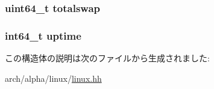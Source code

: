 \label{structAlphaLinux_1_1tgt__sysinfo_a4e4ed68dad22afd974a82cbc557525dc}
\hypertarget{structAlphaLinux_1_1tgt__sysinfo_a083d391d3cd3c507c32c0b3967fdb33c}{
\subsubsection[{totalswap}]{\setlength{\rightskip}{0pt plus 5cm}uint64\_\-t {\bf totalswap}}}
\label{structAlphaLinux_1_1tgt__sysinfo_a083d391d3cd3c507c32c0b3967fdb33c}
\hypertarget{structAlphaLinux_1_1tgt__sysinfo_a382d83f87fed25a254be85c2a0b40b03}{
\subsubsection[{uptime}]{\setlength{\rightskip}{0pt plus 5cm}int64\_\-t {\bf uptime}}}
\label{structAlphaLinux_1_1tgt__sysinfo_a382d83f87fed25a254be85c2a0b40b03}


この構造体の説明は次のファイルから生成されました:\begin{DoxyCompactItemize}
\item 
arch/alpha/linux/\hyperlink{arch_2alpha_2linux_2linux_8hh}{linux.hh}\end{DoxyCompactItemize}
